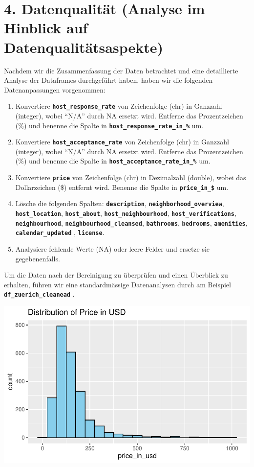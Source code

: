 \documentclass[
  journal,
]{IEEEtran}%
\begin{document}
\section{4. Datenqualität (Analyse im Hinblick auf
Datenqualitätsaspekte)}\label{datenqualituxe4t-analyse-im-hinblick-auf-datenqualituxe4tsaspekte}

Nachdem wir die Zusammenfassung der Daten betrachtet und eine
detaillierte Analyse der Dataframes durchgeführt haben, haben wir die
folgenden Datenanpassungen vorgenommen:

\begin{enumerate}
\def\labelenumi{\arabic{enumi}.}
\item
  Konvertiere \textbf{\texttt{host\_response\_rate}} von Zeichenfolge
  (chr) in Ganzzahl (integer), wobei ``N/A'' durch NA ersetzt wird.
  Entferne das Prozentzeichen (\%) und benenne die Spalte in
  \textbf{\texttt{host\_response\_rate\_in\_\%}} um.
\item
  Konvertiere \textbf{\texttt{host\_acceptance\_rate}} von Zeichenfolge
  (chr) in Ganzzahl (integer), wobei ``N/A'' durch NA ersetzt wird.
  Entferne das Prozentzeichen (\%) und benenne die Spalte in
  \textbf{\texttt{host\_acceptance\_rate\_in\_\%}} um.
\item
  Konvertiere \textbf{\texttt{price}} von Zeichenfolge (chr) in
  Dezimalzahl (double), wobei das Dollarzeichen (\$) entfernt wird.
  Benenne die Spalte in \textbf{\texttt{price\_in\_\$}} um.
\item
  Lösche die folgenden Spalten: \textbf{\texttt{description}},
  \textbf{\texttt{neighborhood\_overview}},
  \textbf{\texttt{host\_location}}, \textbf{\texttt{host\_about}},
  \textbf{\texttt{host\_neighbourhood}},
  \textbf{\texttt{host\_verifications}},
  \textbf{\texttt{neighbourhood}},
  \textbf{\texttt{neighbourhood\_cleansed}},
  \textbf{\texttt{bathrooms}}, \textbf{\texttt{bedrooms}},
  \textbf{\texttt{amenities}}, \textbf{\texttt{calendar\_updated}} ,
  \textbf{\texttt{license}}.
\item
  Analysiere fehlende Werte (NA) oder leere Felder und ersetze sie
  gegebenenfalls.
\end{enumerate}

Um die Daten nach der Bereinigung zu überprüfen und einen Überblick zu
erhalten, führen wir eine standardmässige Datenanalysen durch am
Beispiel \textbf{\texttt{df\_zuerich\_cleanead}} .

\includegraphics{main_files/figure-pdf/eda-1.pdf}
\end{document}
